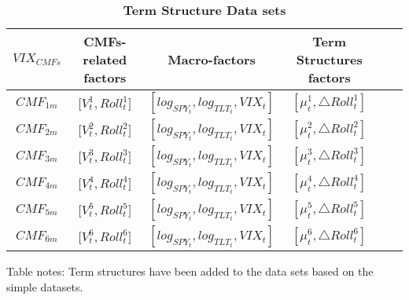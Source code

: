 \documentclass[10pt,letterpaper]{article}
\begin{document}
\begin{table}[!ht]
\centering
\caption{
{\bf Term Structure Data sets}}
\begin{tabular}{|c|c|c|c|c|c|} %
    \hline %
    \(VIX_{CMFs}\)  & CMFs-related factors & Macro-factors & Term Structures factors \\
    \hline %
    \(CMF_{1m}\)  & \({[V_{t}^1},{Roll_{t}^1]}\) & \([log_{SPY_t},log_{TLT_t},VIX_t]\) & \({[\mu_{t}^1, \triangle Roll_{t}^1]}\)  \\
    \hline
    \(CMF_{2m}\)  & \({[V_{t}^2},{Roll_{t}^2]}\)  & \([log_{SPY_t},log_{TLT_t},VIX_t]\) &  \({[\mu_{t}^2, \triangle Roll_{t}^2]}\) \\
    \hline
    \(CMF_{3m}\)  & \({[V_{t}^3},{Roll_{t}^3]}\) & \([log_{SPY_t},log_{TLT_t},VIX_t]\) & \({[\mu_{t}^3, \triangle Roll_{t}^3]}\) \\
    \hline
    \(CMF_{4m}\)& \({[V_{t}^4},{Roll_{t}^4]}\) & \([log_{SPY_t},log_{TLT_t},VIX_t]\) & \({[\mu_{t}^4, \triangle Roll_{t}^4]}\)\\
    \hline
    \(CMF_{5m}\) &  \({[V_{t}^5},{Roll_{t}^5]}\) & \([log_{SPY_t},log_{TLT_t},VIX_t]\) & \({[\mu_{t}^5, \triangle Roll_{t}^5]}\) \\
    \hline
    \(CMF_{6m}\) & \({[V_{t}^6},{Roll_{t}^6]}\) & \([log_{SPY_t},log_{TLT_t},VIX_t]\) & \({[\mu_{t}^6, \triangle Roll_{t}^6]}\)  \\
    \hline %
  \end{tabular}
\begin{flushleft} Table notes: Term structures have been added to the data sets based on the simple datasets.
\end{flushleft}
\label{table_term}
\end{table}
\end{document}
